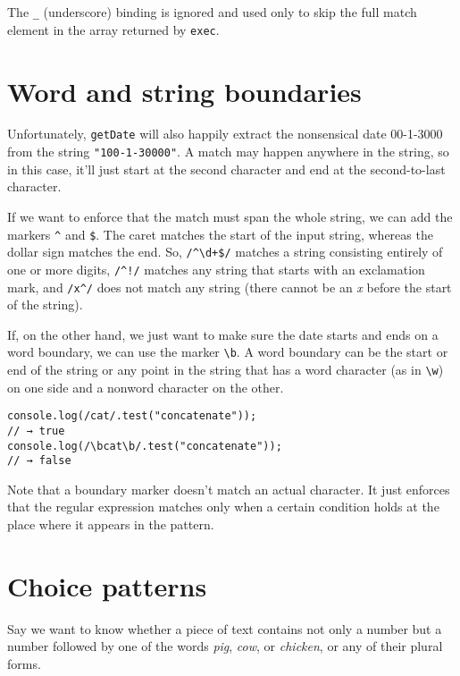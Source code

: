 The \lstinline`_` (underscore) binding is ignored and used only to skip the full match element in the array returned by \lstinline`exec`.

\section{Word and string boundaries}

Unfortunately, \lstinline`getDate` will also happily extract the nonsensical date 00-1-3000 from the string \lstinline`"100-1-30000"`. A match may happen anywhere in the string, so in this case, it'll just start at the second character and end at the second-to-last character.

If we want to enforce that the match must span the whole string, we can add the markers \lstinline`^` and \lstinline`$`. The caret matches the start of the input string, whereas the dollar sign matches the end. So, \lstinline`/^\d+$/` matches a string consisting entirely of one or more digits, \lstinline`/^!/` matches any string that starts with an exclamation mark, and \lstinline`/x^/` does not match any string (there cannot be an \emph{x} before the start of the string).

If, on the other hand, we just want to make sure the date starts and ends on a word boundary, we can use the marker \lstinline`\b`. A word boundary can be the start or end of the string or any point in the string that has a word character (as in \lstinline`\w`) on one side and a nonword character on the other.

\begin{lstlisting}
console.log(/cat/.test("concatenate"));
// → true
console.log(/\bcat\b/.test("concatenate"));
// → false
\end{lstlisting}
\noindent{}

Note that a boundary marker doesn't match an actual character. It just enforces that the regular expression matches only when a certain condition holds at the place where it appears in the pattern.

\section{Choice patterns}

Say we want to know whether a piece of text contains not only a number but a number followed by one of the words \emph{pig}, \emph{cow}, or \emph{chicken}, or any of their plural forms.

